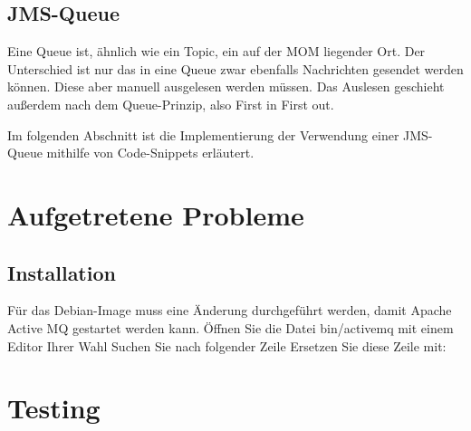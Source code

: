 \documentclass[11pt, a4paper]{article}
\begin{document}
\subsection{JMS-Queue}
Eine Queue ist, ähnlich wie ein Topic, ein auf der MOM liegender Ort. Der Unterschied ist nur das in eine Queue zwar ebenfalls Nachrichten gesendet werden
können. Diese aber manuell ausgelesen werden müssen. Das Auslesen geschieht außerdem nach dem Queue-Prinzip, also First in First out.

Im folgenden Abschnitt ist die Implementierung der Verwendung einer JMS-Queue mithilfe von Code-Snippets erläutert.
\section{Aufgetretene Probleme}
\subsection{Installation}
Für das Debian-Image muss eine Änderung durchgeführt werden, damit Apache Active MQ gestartet werden kann.
Öffnen Sie die Datei bin/activemq mit einem Editor Ihrer Wahl 
Suchen Sie nach folgender Zeile
Ersetzen Sie diese Zeile mit:
\section{Testing}
\end{document}

